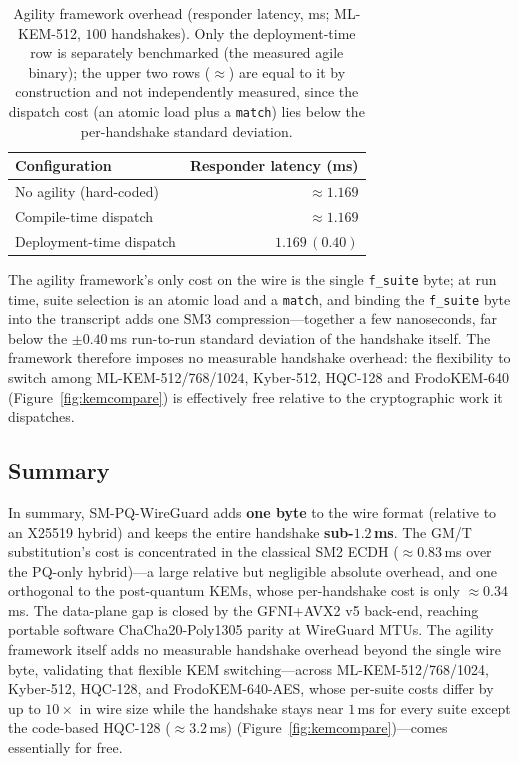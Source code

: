 \documentclass{SCIS2026}
\begin{document}
\begin{table}[htbp]
\centering
\caption{Agility framework overhead (responder latency, ms; ML-KEM-512,
$100$ handshakes).  Only the deployment-time row is separately
benchmarked (the measured agile binary); the upper two rows ($\approx$)
are equal to it by construction and not independently measured, since
the dispatch cost (an atomic load plus a \texttt{match}) lies below the
per-handshake standard deviation.}
\label{tab:agility}
\footnotesize
\tabcolsep 10pt
\begin{tabular}{lr}
\toprule
\textbf{Configuration} & \textbf{Responder latency (ms)} \\
\midrule
No agility (hard-coded)     & $\approx 1.169$ \\
Compile-time dispatch       & $\approx 1.169$ \\
Deployment-time dispatch    & $1.169\,(0.40)$ \\
\bottomrule
\end{tabular}
\end{table}

The agility framework's only cost on the wire is the single
\texttt{f\_suite} byte; at run time, suite selection is an atomic load
and a \texttt{match}, and binding the \texttt{f\_suite} byte into the
transcript adds one SM3 compression---together a few nanoseconds, far
below the
$\pm0.40$\,ms run-to-run standard deviation of the handshake itself.
The framework therefore imposes no measurable handshake overhead: the
flexibility to switch among ML-KEM-512/768/1024, Kyber-512, HQC-128 and
FrodoKEM-640 (Figure~\ref{fig:kemcompare}) is effectively free relative
to the cryptographic work it dispatches.

\subsection{Summary}
\label{sec:perfsummary}

In summary, SM-PQ-WireGuard adds \textbf{one byte} to the wire format
(relative to an X25519 hybrid) and keeps the entire handshake
\textbf{sub-$1.2$\,ms}.  The GM/T
substitution's cost is concentrated in the classical SM2 ECDH
($\approx 0.83$\,ms over the PQ-only hybrid)---a large relative but
negligible absolute overhead, and one orthogonal to the post-quantum
KEMs, whose per-handshake cost is only $\approx 0.34$\,ms.  The
data-plane gap is closed by the GFNI+AVX2 v5 back-end, reaching
portable software ChaCha20-Poly1305 parity at WireGuard MTUs.  The
agility framework itself adds no measurable handshake overhead beyond
the single wire byte, validating that flexible KEM switching---across
ML-KEM-512/768/1024, Kyber-512, HQC-128, and FrodoKEM-640-AES, whose
per-suite costs differ by up to $10\times$ in wire size while the
handshake stays near $1$\,ms for every suite except the code-based
HQC-128 ($\approx 3.2$\,ms) (Figure~\ref{fig:kemcompare})---comes
essentially for free.
\end{document}
